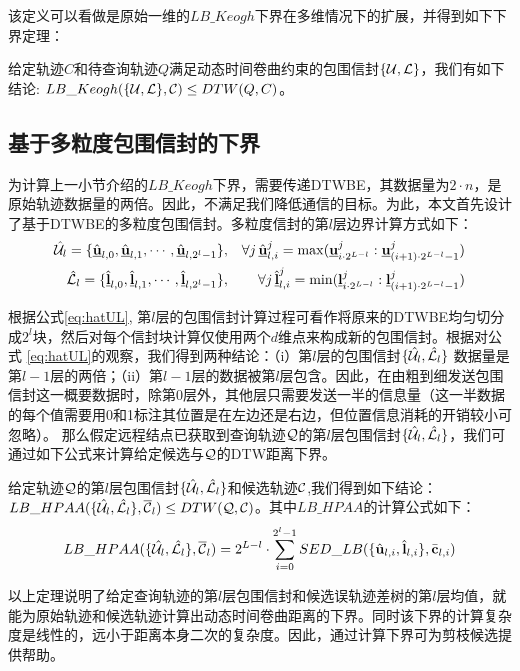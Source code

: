 该定义可以看做是原始一维的$LB\_Keogh$下界在多维情况下的扩展，并得到如下下界定理：
\begin{theorem}\label{theorem:DTWLBK}
	给定轨迹$C$和待查询轨迹$Q$满足动态时间卷曲约束的包围信封$\{{\cal U}, {\cal L}\}$，我们有如下结论: $LB\_Keogh({\{\cal U,\cal L\},{\cal C}}) \le DTW(Q,C)$。
\end{theorem}


\subsection{基于多粒度包围信封的下界} 
为计算上一小节介绍的$LB\_Keogh$下界，需要传递DTWBE，其数据量为$2\cdot n$，是原始轨迹数据量的两倍。因此，不满足我们降低通信的目标。为此，本文首先设计了基于DTWBE的多粒度包围信封。多粒度信封的第$l$层边界计算方式如下：
\begin{eqnarray}\label{eq:hatUL}
\hat{{\cal U}}_l =\{ \hat{\emph{{\textbf{u}}}}_{l,0}, \hat{\emph{{\textbf{u}}}}_{l,1},\cdots, \hat{\emph{{\textbf{u}}}}_{l,2^l-1}\}  &,&
\forall j  \, \hat{\emph{{\textbf{u}}}}_{l,i}^{j}=\max(\emph{{\textbf{u}}}_{i\cdot 2^{L-l}}^{j} : \emph{{\textbf{u}}}_{(i+1)\cdot 2^{L-l}-1}^{j})  \nonumber \\
\hat{{\cal L}}_l=\{\hat{\emph{{\textbf{l}}}}_{l,0}, \hat{\emph{{\textbf{l}}}}_{l,1},\cdots, \hat{\emph{{\textbf{l}}}}_{l,2^l-1}\}   &,&
\forall j  \, \hat{\emph{{\textbf{l}}}}_{l,i}^{j}=\min(\emph{{\textbf{l}}}_{i\cdot 2^{L-l}}^{j} : \emph{{\textbf{l}}}_{(i+1)\cdot 2^{L-l}-1}^{j})
\end{eqnarray}	

根据公式\ref{eq:hatUL}, 第$l$层的包围信封计算过程可看作将原来的DTWBE均匀切分成$2^l$块，然后对每个信封块计算仅使用两个$d$维点来构成新的包围信封。根据对公式 \ref{eq:hatUL}的观察，我们得到两种结论：（i）第$l$层的包围信封$\{\hat{{\cal U}}_{l}, \hat{{\cal L}}_{l}\}$ 数据量是第$l-1$层的两倍；（ii）第$l-1$层的数据被第$l$层包含。因此，在由粗到细发送包围信封这一概要数据时，除第$0$层外，其他层只需要发送一半的信息量（这一半数据的每个值需要用0和1标注其位置是在左边还是右边，但位置信息消耗的开销较小可忽略）。
那么假定远程结点已获取到查询轨迹$\cal Q$的第$l$层包围信封$\{\hat{{\cal U}}_l,\hat{{\cal L}}_l\}$，我们可通过如下公式来计算给定候选与$\cal Q$的DTW距离下界。
\begin{theorem}\label{theo:HPAA}
	给定轨迹$\cal Q$的第$l$层包围信封$\{\hat{{\cal U}}_{l}, \hat{{\cal L}}_{l}\}$和候选轨迹$\cal C$,我们得到如下结论：
	 $LB\_HPAA({  \{\hat{{\cal U}_{l}}, \hat{{\cal L}_{l}}\},\overline{{\cal C}}_{l}}) \le DTW(\cal Q, \cal C)$。其中$LB\_HPAA$的计算公式如下：
	 \begin{eqnarray}\label{bound:HPAA}
	 LB\_HPAA({\{\hat{{\cal U}_{l}}, \hat{{\cal L}_{l}}\},\overline{{\cal C}}_{l}})= 2^{L-l} \cdot \sum_{i=0}^{2^{l}-1} SED\_LB(\{ \hat{\textbf{u}}_{l,i}, \hat{\textbf{l}}_{l,i} \}, \bar{\textbf{c}}_{l,i})\nonumber
	 \end{eqnarray}
\end{theorem}
以上定理说明了给定查询轨迹的第$l$层包围信封和候选误轨迹差树的第$l$层均值，就能为原始轨迹和候选轨迹计算出动态时间卷曲距离的下界。同时该下界的计算复杂度是线性的，远小于距离本身二次的复杂度。因此，通过计算下界可为剪枝候选提供帮助。

